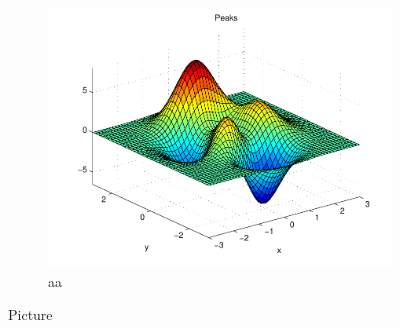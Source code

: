 \begin{figure}[h]
\begin{subfigure}[b]{0.45\textwidth}
	\includegraphics[width=\textwidth]{mcmthesis-aaa-eps-converted-to.pdf}
	\caption{aa} 
	\label{fig:aa4}
\end{subfigure}
\caption{Picture}
\label{fig:aa}
\end{figure}